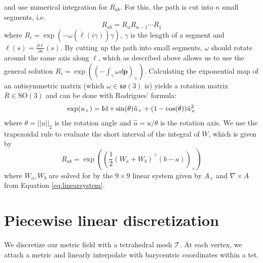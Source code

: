 \documentclass[../thesis.tex]{subfiles}
\begin{document}
and use numerical integration for $R_{ab}$. For this, the path is cut into $n$ small segments, i.e.
$$R_{ab}= R_nR_{n-1} \dotsb R_1$$
where $R_i = \exp(-\omega (\dot{\ell}(i\gamma))\gamma)$, $\gamma$ is the length of a segment and $\dot{\ell}(s)=\frac{\partial \ell}{\partial s}(s)$.
By cutting up the path into small segments, $\omega$ should rotate around the same axis along $\ell$, which as described above
allows us to use the general solution $R_{i}=\exp((-\int_{\gamma} \omega d\bm{p})_{\times})$.
Calculating the exponential map of an antisymmetric matrix (which $\omega \in \mathfrak{so}(3)$ is) yields a
rotation matrix $R\in \mathrm{SO}(3)$ and can be done with Rodrigues' formula:
$$\exp(u_{\times}) = \operatorname{Id} + \sin(\theta) \hat{u}_{\times} + (1-\cos(\theta)) \hat{u}_{\times}^2$$
where $\theta = ||u||_2$ is the rotation angle and $\hat{u}= u/\theta$ is the rotation axis.
We use the trapezoidal rule to evaluate the short interval of the integral of $W$, which is given by
$$R_{ab}=\exp \left( \left(\frac{1}{2}(W_a + W_b)^{\top}(b-a)\right)_{\times}\right)$$
where $W_a, W_b$ are solved for by the $9\times9$ linear system given by $A_{\times}$ and $\nabla \times A$ from Equation \ref{eq:linearsystem}.


\section{Piecewise linear discretization}
We discretize our metric field with a tetrahedral mesh $\mathcal{T}$.
At each vertex, we attach a metric and linearly interpolate with barycentric coordinates within a tet.
\end{document}
